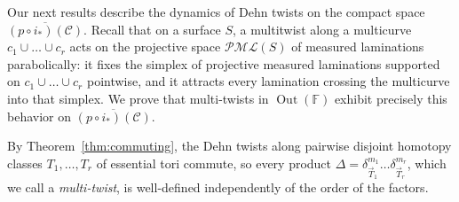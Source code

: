 \documentclass[12pt,a4paper]{amsart}
\numberwithin{equation}{section}
\DeclareMathOperator{\Out}{Out}
\newcommand{\FF}{\mathbb{F}}
\theoremstyle{plain}
\newtheorem{theorem}{Theorem}[section]
\theoremstyle{definition}
\theoremstyle{remark}
\begin{document}


Our next results describe the dynamics of Dehn twists on the compact space $\overline{(p \circ i_*)(\mathcal{C})}$.
Recall that on a surface $S$, a multitwist along a multicurve $c_1 \cup \dots \cup c_r$ acts on the projective space $\mathcal{PML}(S)$ of measured laminations parabolically: it fixes the simplex of projective measured laminations supported on $c_1 \cup \dots \cup c_r$ pointwise, and it attracts every lamination crossing the multicurve into that simplex.
We prove that multi-twists in $\Out(\FF)$ exhibit precisely this behavior on $\overline{(p \circ i_*)(\mathcal{C})}$.

By Theorem~\ref{thm:commuting}, the Dehn twists along pairwise disjoint homotopy classes $T_1, \dots, T_r$ of essential tori commute, so every product $\Delta = \delta_{\vec{T}_1}^{m_1} \dots \delta_{\vec{T}_r}^{m_r}$, which we call a \emph{multi-twist}, is well-defined independently of the order of the factors.
\end{document}

